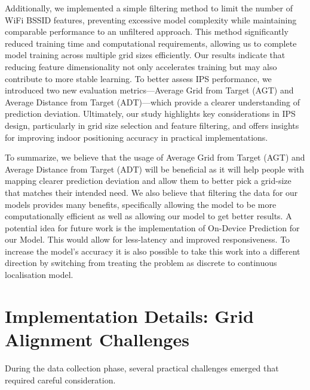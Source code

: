 \documentclass[runningheads]{llncs}
\begin{document}
Additionally, we implemented a simple filtering method to limit the number of WiFi BSSID features, preventing excessive model complexity while maintaining comparable performance to an unfiltered approach. This method significantly reduced training time and computational requirements, allowing us to complete model training across multiple grid sizes efficiently. Our results indicate that reducing feature dimensionality not only accelerates training but may also contribute to more stable learning. To better assess IPS performance, we introduced two new evaluation metrics—Average Grid from Target (AGT) and Average Distance from Target (ADT)—which provide a clearer understanding of prediction deviation. Ultimately, our study highlights key considerations in IPS design, particularly in grid size selection and feature filtering, and offers insights for improving indoor positioning accuracy in practical implementations.

To summarize, we believe that the usage of Average Grid from Target (AGT)
and Average Distance from Target (ADT) will be beneficial as it will help people with mapping clearer prediction deviation and allow them to better pick a grid-size that matches their intended need. We also believe that filtering the data for our models provides many benefits, specifically allowing the model to be more computationally efficient as well as allowing our model to get better results. A potential idea for future work is the implementation of On-Device Prediction for our Model. This would allow for less-latency and improved responsiveness. To increase the model’s accuracy it is also possible to take this work into a different direction by switching from treating the problem as discrete to continuous localisation model.

\nocite{bgp4, add2, add3, add4}



\appendix
\section{Implementation Details: Grid Alignment Challenges}

During the data collection phase, several practical challenges emerged that required careful consideration.
\end{document}
